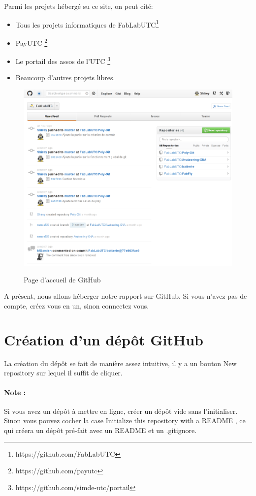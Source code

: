 \documentclass[a4paper]{article}
\begin{document}
Parmi les projets hébergé su ce site, on peut cité:
\begin{itemize}
\item Tous les projets informatiques de FabLabUTC\footnote{https://github.com/FabLabUTC}
\item PayUTC \footnote{https://github.com/payutc}
\item Le portail des assos de l'UTC \footnote{https://github.com/simde-utc/portail}
\item Beaucoup d'autres projets libres.
\end{itemize}

\begin{figure}
\includegraphics[scale=0.6]{accueil_github.png}
\label{Page d'accueil de GitHub}
\caption{Page d'accueil de GitHub}
\end{figure}

A présent, nous allons héberger notre rapport sur GitHub. Si vous n'avez pas de compte, créez vous en un, sinon connectez vous.

\section{Création d'un dépôt GitHub}

La création du dépôt se fait de manière assez intuitive, il y a un bouton \og New repository \fg sur lequel il suffit de cliquer.

\paragraph{Note : }Si vous avez un dépôt à mettre en ligne, créer un dépôt vide sans l'initialiser. Sinon vous pouvez cocher la case \og Initialize this repository with a README  \fg, ce qui créera un dépôt pré-fait avec un README et un .gitignore.
\end{document}

